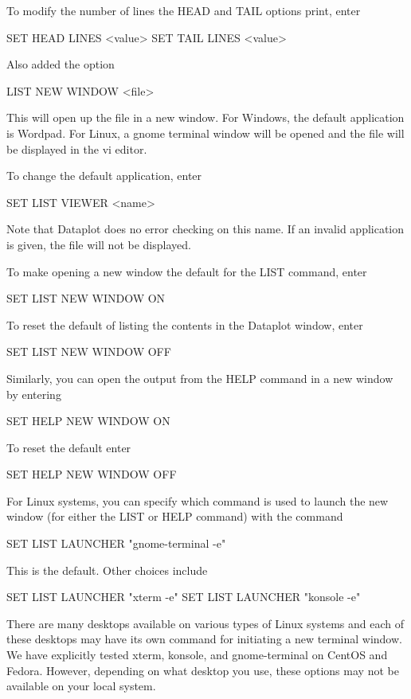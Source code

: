        To modify the number of lines the HEAD and TAIL options print,
       enter

          SET HEAD LINES <value>
          SET TAIL LINES <value>

       Also added the option

          LIST NEW WINDOW <file>

       This will open up the file in a new window.  For Windows, the
       default application is Wordpad.  For Linux, a gnome terminal window
       will be opened and the file will be displayed in the vi editor.

       To change the default application, enter

          SET LIST VIEWER <name>

       Note that Dataplot does no error checking on this name.  If
       an invalid application is given, the file will not be displayed.

       To make opening a new window the default for the LIST command,
       enter

          SET LIST NEW WINDOW ON

       To reset the default of listing the contents in the Dataplot
       window, enter

          SET LIST NEW WINDOW OFF

       Similarly, you can open the output from the HELP command in a
       new window by entering

          SET HELP NEW WINDOW ON

       To reset the default enter

          SET HELP NEW WINDOW OFF

       For Linux systems, you can specify which command is used
       to launch the new window (for either the LIST or HELP
       command) with the command

          SET LIST LAUNCHER  "gnome-terminal -e"

       This is the default.  Other choices include

          SET LIST LAUNCHER  "xterm -e"
          SET LIST LAUNCHER  "konsole -e"

       There are many desktops available on various types of Linux
       systems and each of these desktops may have its own
       command for initiating a new terminal window.  We have
       explicitly tested xterm, konsole, and gnome-terminal on
       CentOS and Fedora.  However, depending on what desktop you
       use, these options may not be available on your local system.

